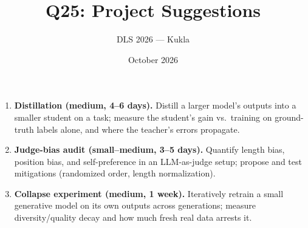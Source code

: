 \documentclass[11pt]{article}
\title{Q25: Project Suggestions}
\author{DLS 2026 --- Kukla}
\date{October 2026}
\begin{document}
\maketitle
\begin{enumerate}[leftmargin=1.5em]
\item \textbf{Distillation (medium, 4--6 days).} Distill a larger model's outputs into a smaller student on a task; measure the student's gain vs.\ training on ground-truth labels alone, and where the teacher's errors propagate.
\item \textbf{Judge-bias audit (small--medium, 3--5 days).} Quantify length bias, position bias, and self-preference in an LLM-as-judge setup; propose and test mitigations (randomized order, length normalization).
\item \textbf{Collapse experiment (medium, 1 week).} Iteratively retrain a small generative model on its own outputs across generations; measure diversity/quality decay and how much fresh real data arrests it.
\end{enumerate}
\end{document}
